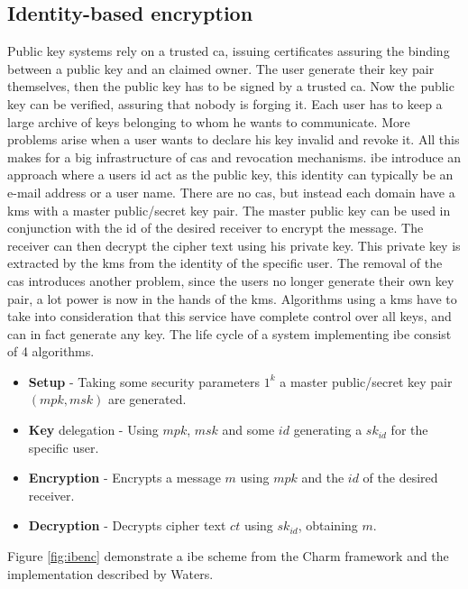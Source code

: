 \subsection{Identity-based encryption}\label{subsec:IBE}
Public key systems rely on a trusted \gls{ca}, issuing certificates assuring the binding between a public key and an claimed owner. The user generate their key pair themselves, then the public key has to be signed by a trusted \glsdesc{ca}. Now the public key can be verified, assuring that nobody is forging it. Each user has to keep a large archive of keys belonging to whom he wants to communicate. More problems arise when a user wants to declare his key invalid and revoke it. All this makes for a big infrastructure of \glspl{ca} and revocation mechanisms. \Gls{ibe}\cite{DBLP:ibe} introduce an approach where a users id act as the public key, this identity can typically be an e-mail address or a user name. There are no \glspl{ca}, but instead each domain have a \gls{kms} with a master public/secret key pair. The master public key can be used in conjunction with the id of the desired receiver to encrypt the message. The receiver can then decrypt the cipher text using his private key. This private key is extracted by the \gls{kms} from the identity of the specific user. The removal of the \glspl{ca} introduces another problem, since the users no longer generate their own key pair, a lot power is now in the hands of the \gls{kms}. Algorithms using a \gls{kms} have to take into consideration that this service have complete control over all keys, and can in fact generate any key. The life cycle of a system implementing \gls{ibe} consist of 4 algorithms. 

\begin{itemize}
\item \textbf{ Setup } - Taking some security parameters $1^k$ a master public/secret key pair $(mpk, msk)$ are generated.
\item \textbf{ Key } delegation - Using $mpk$, $msk$ and some $id$ generating a $sk_{id}$ for the specific user. 
\item \textbf{ Encryption } - Encrypts a message $m$ using $mpk$ and the $id$ of the desired receiver. 
\item \textbf{ Decryption } - Decrypts cipher text $ct$ using $sk_{id}$, obtaining $m$. 
\end{itemize}
\newpage
Figure \ref{fig:ibenc} demonstrate a \gls{ibe} scheme from the Charm framework and the implementation described by Waters\cite{ibe_waters09}.


